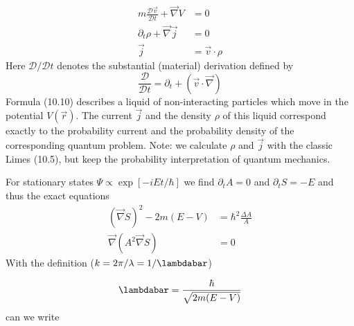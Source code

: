 \begin{equation}
\begin{aligned} m \frac{\mathcal{D} \vec{v}}{\mathcal{D} t}+\vec{\nabla} V &=0 \\ \partial_{t} \rho+\vec{\nabla} \vec{j} &=0 \\ \vec{j} &=\vec{v} \cdot \rho \end{aligned}
\end{equation}
Here $\mathcal{D}/\mathcal{D}t$ denotes the substantial (material) derivation defined by
\begin{equation}
    \frac{\mathcal{D}}{\mathcal{D} t}=\partial_{t}+(\vec{v} \cdot \vec{\nabla})
    \end{equation}
Formula (10.10) describes a liquid of non-interacting particles which move in the potential $V (\vec{r})$. The current $\vec{j}$ and the density $\rho$ of this liquid correspond exactly to the probability current and the probability density of the corresponding quantum problem. Note: we calculate $\rho$ and $\vec{j}$ with the classic Limes (10.5), but keep the probability interpretation of quantum mechanics.\par
For stationary states $\Psi\propto \operatorname{exp}[-iEt/\hbar]$ we find $\partial_tA = 0$ and $\partial_tS = −E$ and thus the exact equations
\begin{equation}
\begin{aligned}(\vec{\nabla} S)^{2}-2 m(E-V) &=\hbar^{2} \frac{\Delta A}{A} \\ \vec{\nabla}\left(A^{2} \vec{\nabla} S\right) &=0 \end{aligned}
\end{equation}
With the definition ($k = 2\pi /\lambda = 1 / \lambdabar$)

\begin{equation}
    \lambdabar=\frac{\hbar}{\sqrt{2 m(E-V)}}
    \end{equation}
can we write

